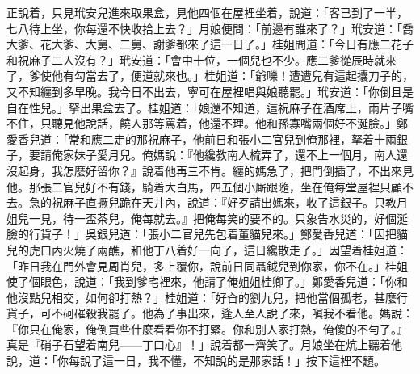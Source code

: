 正說着，只見玳安兒進來取果盒，見他四個在屋裡坐着，說道：「客已到了一半，七八待上坐，你每還不快收拾上去？」月娘便問：「前邊有誰來了？」玳安道：「喬大爹、花大爹、大舅、二舅、謝爹都來了這一日了。」桂姐問道：「今日有應二花子和祝麻子二人沒有？」玳安道：「會中十位，一個兒也不少。應二爹從辰時就來了，爹使他有勾當去了，便道就來也。」桂姐道：「爺嚛！遭遭兒有這起攮刀子的，又不知纏到多早晚。我今日不出去，寧可在屋裡唱與娘聽罷。」{}玳安道：「你倒且是自在性兒。」拏出果盒去了。桂姐道：「娘還不知道，這祝麻子在酒席上，兩片子嘴不住，只聽見他說話，饒人那等罵着，他還不理。他和孫寡嘴兩個好不涎臉。」{}鄭愛香兒道：「常和應二走的那祝麻子，他前日和張小二官兒到俺那裡，拏着十兩銀子，要請俺家妹子愛月兒。{}俺媽說：『他纔教南人梳弄了，還不上一個月，南人還沒起身，我怎麼好留你？』說着他再三不肯。纏的媽急了，把門倒插了，不出來見他。那張二官兒好不有錢，騎着大白馬，四五個小厮跟隨，坐在俺每堂屋裡只顧不去。{}急的祝麻子直撅兒跪在天井內，說道：『好歹請出媽來，收了這銀子。只教月姐兒一見，待一盃茶兒，俺每就去。』把俺每笑的要不的。只象告水災的，好個涎臉的行貨子！」吳銀兒道：「張小二官兒先包着董貓兒來。」鄭愛香兒道：「因把貓兒的虎口內火燒了兩醮，和他丁八着好一向了，這日纔散走了。」因望着桂姐道：「昨日我在門外會見周肖兒，多上覆你，說前日同聶鉞兒到你家，你不在。」桂姐使了個眼色，說道：「我到爹宅裡來，他請了俺姐姐桂卿了。」鄭愛香兒道：「你和他沒點兒相交，如何卻打熱？」桂姐道：「好㒲的劉九兒，{}把他當個孤老，甚麼行貨子，可不砢磪殺我罷了。他為了事出來，逢人至人說了來，嗔我不看他。媽說：『你只在俺家，俺倒買些什麼看看你不打緊。你和別人家打熱，俺傻的不勻了。』真是『硝子石望着南兒——丁口心』！」說着都一齊笑了。月娘坐在炕上聽着他說，道：「你每說了這一日，我不懂，不知說的是那家話！」按下這裡不題。

